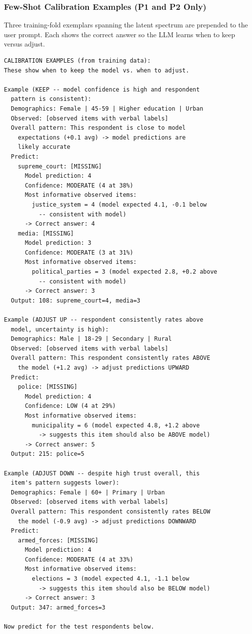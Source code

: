 \documentclass[
  man,
  floatsintext,
  longtable,
  nolmodern,
  notxfonts,
  notimes,
  colorlinks=true,linkcolor=blue,citecolor=blue,urlcolor=blue]{apa7}
\begin{document}
\subsubsection{Few-Shot Calibration Examples (P1 and P2
Only)}\label{few-shot-calibration-examples-p1-and-p2-only}

Three training-fold exemplars spanning the latent spectrum are prepended
to the user prompt. Each shows the correct answer so the LLM learns when
to keep versus adjust.

\begin{verbatim}
CALIBRATION EXAMPLES (from training data):
These show when to keep the model vs. when to adjust.

Example (KEEP -- model confidence is high and respondent
  pattern is consistent):
  Demographics: Female | 45-59 | Higher education | Urban
  Observed: [observed items with verbal labels]
  Overall pattern: This respondent is close to model
    expectations (+0.1 avg) -> model predictions are
    likely accurate
  Predict:
    supreme_court: [MISSING]
      Model prediction: 4
      Confidence: MODERATE (4 at 38%)
      Most informative observed items:
        justice_system = 4 (model expected 4.1, -0.1 below
          -- consistent with model)
      -> Correct answer: 4
    media: [MISSING]
      Model prediction: 3
      Confidence: MODERATE (3 at 31%)
      Most informative observed items:
        political_parties = 3 (model expected 2.8, +0.2 above
          -- consistent with model)
      -> Correct answer: 3
  Output: 108: supreme_court=4, media=3

Example (ADJUST UP -- respondent consistently rates above
  model, uncertainty is high):
  Demographics: Male | 18-29 | Secondary | Rural
  Observed: [observed items with verbal labels]
  Overall pattern: This respondent consistently rates ABOVE
    the model (+1.2 avg) -> adjust predictions UPWARD
  Predict:
    police: [MISSING]
      Model prediction: 4
      Confidence: LOW (4 at 29%)
      Most informative observed items:
        municipality = 6 (model expected 4.8, +1.2 above
          -> suggests this item should also be ABOVE model)
      -> Correct answer: 5
  Output: 215: police=5

Example (ADJUST DOWN -- despite high trust overall, this
  item's pattern suggests lower):
  Demographics: Female | 60+ | Primary | Urban
  Observed: [observed items with verbal labels]
  Overall pattern: This respondent consistently rates BELOW
    the model (-0.9 avg) -> adjust predictions DOWNWARD
  Predict:
    armed_forces: [MISSING]
      Model prediction: 4
      Confidence: MODERATE (4 at 33%)
      Most informative observed items:
        elections = 3 (model expected 4.1, -1.1 below
          -> suggests this item should also be BELOW model)
      -> Correct answer: 3
  Output: 347: armed_forces=3

Now predict for the test respondents below.
\end{verbatim}
\end{document}
